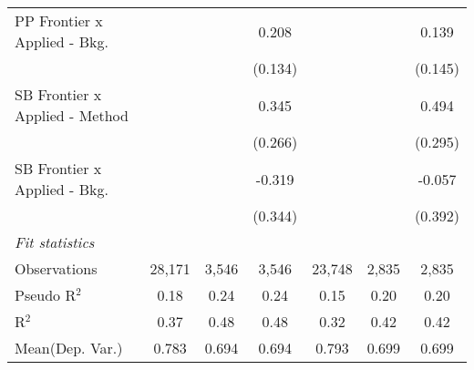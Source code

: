 \begin{tabular}{lcccccc}
   PP Frontier x Applied - Bkg.   &                &              & 0.208          &                &             & 0.139\\   
                                  &                &              & (0.134)        &                &             & (0.145)\\   
   SB Frontier x Applied - Method &                &              & 0.345          &                &             & 0.494\\   
                                  &                &              & (0.266)        &                &             & (0.295)\\   
   SB Frontier x Applied - Bkg.   &                &              & -0.319         &                &             & -0.057\\   
                                  &                &              & (0.344)        &                &             & (0.392)\\   
   \midrule
   \emph{Fit statistics}\\
   Observations                   & 28,171         & 3,546        & 3,546          & 23,748         & 2,835       & 2,835\\  
   Pseudo R$^2$                   & 0.18           & 0.24         & 0.24           & 0.15           & 0.20        & 0.20\\  
   R$^2$                          & 0.37           & 0.48         & 0.48           & 0.32           & 0.42        & 0.42\\  
Mean(Dep. Var.) & 0.783 & 0.694 & 0.694 & 0.793 & 0.699 & 0.699 \\
   

\end{tabular}
